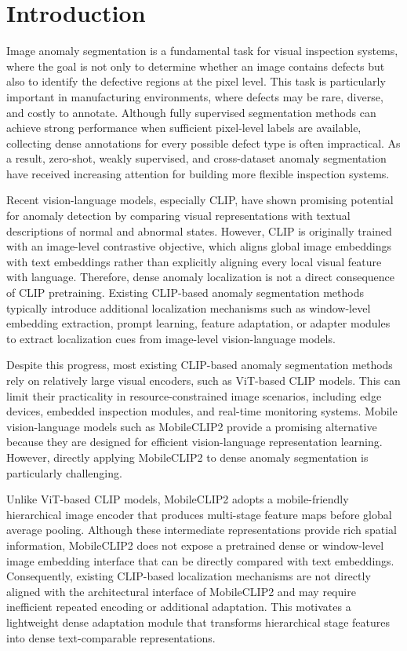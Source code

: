 \documentclass[10pt]{article}
\begin{document}
\section{Introduction}

Image anomaly segmentation is a fundamental task for visual inspection systems, where the goal is not only to determine whether an image contains defects but also to identify the defective regions at the pixel level. This task is particularly important in manufacturing environments, where defects may be rare, diverse, and costly to annotate. Although fully supervised segmentation methods can achieve strong performance when sufficient pixel-level labels are available, collecting dense annotations for every possible defect type is often impractical. As a result, zero-shot, weakly supervised, and cross-dataset anomaly segmentation have received increasing attention for building more flexible inspection systems.

Recent vision-language models, especially CLIP, have shown promising potential for anomaly detection by comparing visual representations with textual descriptions of normal and abnormal states. However, CLIP is originally trained with an image-level contrastive objective, which aligns global image embeddings with text embeddings rather than explicitly aligning every local visual feature with language. Therefore, dense anomaly localization is not a direct consequence of CLIP pretraining. Existing CLIP-based anomaly segmentation methods typically introduce additional localization mechanisms such as window-level embedding extraction, prompt learning, feature adaptation, or adapter modules to extract localization cues from image-level vision-language models.

Despite this progress, most existing CLIP-based anomaly segmentation methods rely on relatively large visual encoders, such as ViT-based CLIP models. This can limit their practicality in resource-constrained image scenarios, including edge devices, embedded inspection modules, and real-time monitoring systems. Mobile vision-language models such as MobileCLIP2 provide a promising alternative because they are designed for efficient vision-language representation learning. However, directly applying MobileCLIP2 to dense anomaly segmentation is particularly challenging.

Unlike ViT-based CLIP models, MobileCLIP2 adopts a mobile-friendly hierarchical image encoder that produces multi-stage feature maps before global average pooling. Although these intermediate representations provide rich spatial information, MobileCLIP2 does not expose a pretrained dense or window-level image embedding interface that can be directly compared with text embeddings. Consequently, existing CLIP-based localization mechanisms are not directly aligned with the architectural interface of MobileCLIP2 and may require inefficient repeated encoding or additional adaptation. This motivates a lightweight dense adaptation module that transforms hierarchical stage features into dense text-comparable representations.
\end{document}
